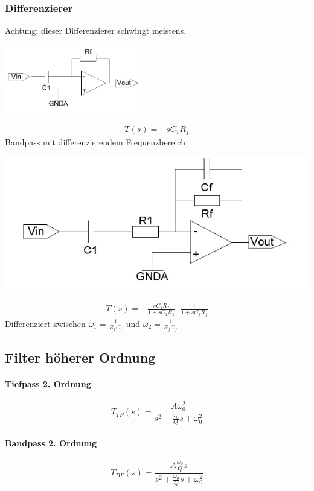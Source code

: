\newpage
\subsubsection{Differenzierer}
\begin{multicols}{2}


	Achtung: dieser Differenzierer schwingt meistens.
	\begin{center}
		\includegraphics[width=6cm]{images/filter_1_diff.jpg}
	\end{center}
	\begin{align*}
		T(s) = -s C_1 R_f
	\end{align*}
\vfill	
\columnbreak
	Bandpass mit differenzierendem Frequenzbereich
	\begin{center}
		\includegraphics[width=0.7\linewidth]{images/filter_1_diff2.jpg}
	\end{center}
	\begin{align*}
		T(s) = - \frac{s C_1 R_f}{1 + s C_1 R_1} \cdot \frac{1}{1 + s C_f R_f}
	\end{align*}
	Differenziert zwischen $\omega_1 = \frac{1}{R_1 C_1}$ und 
	$\omega_2 = \frac{1}{R_f C_f}$

\end{multicols}

\subsection{Filter höherer Ordnung}

\begin{multicols}{2}
	\paragraph{Tiefpass 2. Ordnung}
	\begin{equation*}
		T_{TP}(s) = \frac{A \omega_0^2}{s^2 + \frac{\omega_0}{Q} s + \omega_0^2}
	\end{equation*}
	
	\paragraph{Bandpass 2. Ordnung}
	\begin{equation*}
		T_{BP}(s) = \frac{A \frac{\omega_0}{Q} s}{s^2 + \frac{\omega_0}{Q} s + \omega_0^2}
	\end{equation*}
\end{multicols}


